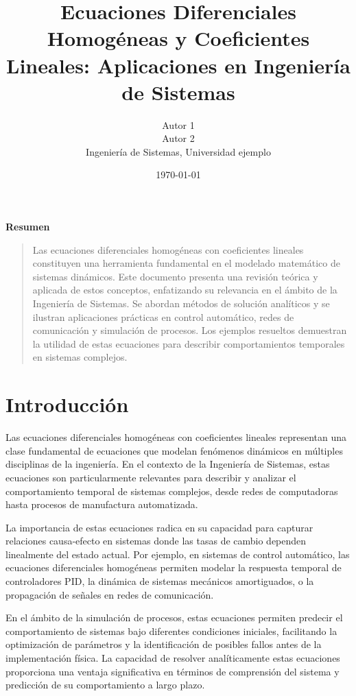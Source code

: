 \documentclass[12pt]{article}
\title{
    \vspace{2cm}
    \Large\textbf{Ecuaciones Diferenciales Homogéneas y Coeficientes Lineales: Aplicaciones en Ingeniería de Sistemas}
    \vspace{1cm}
}
\author{
    Autor 1 \\
    Autor 2 \\
    Ingeniería de Sistemas, Universidad ejemplo \\
}
\date{\today}
\begin{document}
\maketitle
\thispagestyle{empty}
\vfill
\begin{center}
    \textbf{Resumen}
\end{center}
\begin{quote}
    Las ecuaciones diferenciales homogéneas con coeficientes lineales constituyen una herramienta fundamental en el modelado matemático de sistemas dinámicos. Este documento presenta una revisión teórica y aplicada de estos conceptos, enfatizando su relevancia en el ámbito de la Ingeniería de Sistemas. Se abordan métodos de solución analíticos y se ilustran aplicaciones prácticas en control automático, redes de comunicación y simulación de procesos. Los ejemplos resueltos demuestran la utilidad de estas ecuaciones para describir comportamientos temporales en sistemas complejos.
\end{quote}
\newpage

\section{Introducción}

Las ecuaciones diferenciales homogéneas con coeficientes lineales representan una clase fundamental de ecuaciones que modelan fenómenos dinámicos en múltiples disciplinas de la ingeniería. En el contexto de la Ingeniería de Sistemas, estas ecuaciones son particularmente relevantes para describir y analizar el comportamiento temporal de sistemas complejos, desde redes de computadoras hasta procesos de manufactura automatizada.

La importancia de estas ecuaciones radica en su capacidad para capturar relaciones causa-efecto en sistemas donde las tasas de cambio dependen linealmente del estado actual. Por ejemplo, en sistemas de control automático, las ecuaciones diferenciales homogéneas permiten modelar la respuesta temporal de controladores PID, la dinámica de sistemas mecánicos amortiguados, o la propagación de señales en redes de comunicación.

En el ámbito de la simulación de procesos, estas ecuaciones permiten predecir el comportamiento de sistemas bajo diferentes condiciones iniciales, facilitando la optimización de parámetros y la identificación de posibles fallos antes de la implementación física. La capacidad de resolver analíticamente estas ecuaciones proporciona una ventaja significativa en términos de comprensión del sistema y predicción de su comportamiento a largo plazo.
\end{document}
